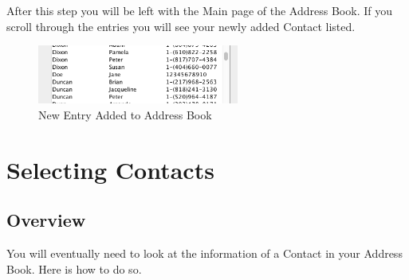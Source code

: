 \documentclass[a4paper, 11pt]{article}
\begin{document}
\begin{enumerate}[label=\textbf{\arabic*})]
    \clearpage
    
    After this step you will be left with the Main page of the Address Book. If you scroll through the entries you will see your newly added Contact listed.
    
    \begin{figure}[h!]
    \centering
      \includegraphics[width=250]{jane_doe_added.png}
      \caption{New Entry Added to Address Book}
    \end{figure}
   
\end{enumerate}

\clearpage

\section{Selecting Contacts}
\subsection{Overview}
You will eventually need to look at the information of a Contact in your Address Book. Here is how to do so.
\end{document}
